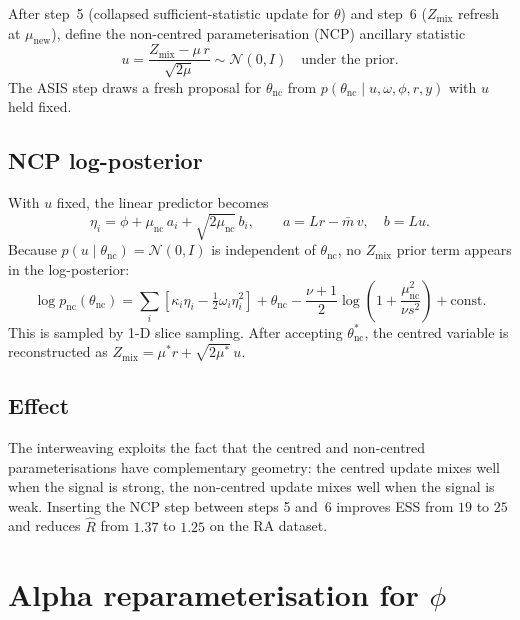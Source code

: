 \documentclass[11pt,a4paper]{article}
\begin{document}
After step~5 (collapsed sufficient-statistic update for $\theta$) and step~6 ($Z_{\text{mix}}$ refresh at $\mu_{\text{new}}$), define the non-centred parameterisation (NCP) ancillary statistic
\begin{equation}
  u = \frac{Z_{\text{mix}} - \mu\, r}{\sqrt{2\mu}} \sim \mathcal{N}(0, I) \quad \text{under the prior.}
\end{equation}
The ASIS step draws a fresh proposal for $\theta_{\text{nc}}$ from $p(\theta_{\text{nc}} \mid u, \omega, \phi, r, y)$ with $u$ held fixed.

\subsection{NCP log-posterior}

With $u$ fixed, the linear predictor becomes
\begin{equation}
  \eta_i = \phi + \mu_{\text{nc}}\, a_i + \sqrt{2\mu_{\text{nc}}}\, b_i,
  \qquad a = L r - \bar{m}\, v, \quad b = L u.
\end{equation}
Because $p(u \mid \theta_{\text{nc}}) = \mathcal{N}(0, I)$ is independent of $\theta_{\text{nc}}$, no $Z_{\text{mix}}$ prior term appears in the log-posterior:
\begin{equation}
  \log p_{\text{nc}}(\theta_{\text{nc}}) = \sum_i \left[\kappa_i \eta_i - \tfrac{1}{2}\omega_i \eta_i^2\right]
    + \theta_{\text{nc}}
    - \frac{\nu+1}{2}\log\!\left(1 + \frac{\mu_{\text{nc}}^2}{\nu s^2}\right)
    + \text{const.}
\end{equation}
This is sampled by 1-D slice sampling. After accepting $\theta_{\text{nc}}^*$, the centred variable is reconstructed as $Z_{\text{mix}} = \mu^* r + \sqrt{2\mu^*}\, u$.

\subsection{Effect}

The interweaving exploits the fact that the centred and non-centred parameterisations have complementary geometry: the centred update mixes well when the signal is strong, the non-centred update mixes well when the signal is weak. Inserting the NCP step between steps 5 and~6 improves ESS from $19$ to $25$ and reduces $\hat{R}$ from $1.37$ to $1.25$ on the RA dataset.

\section{Alpha reparameterisation for $\phi$}
\end{document}
